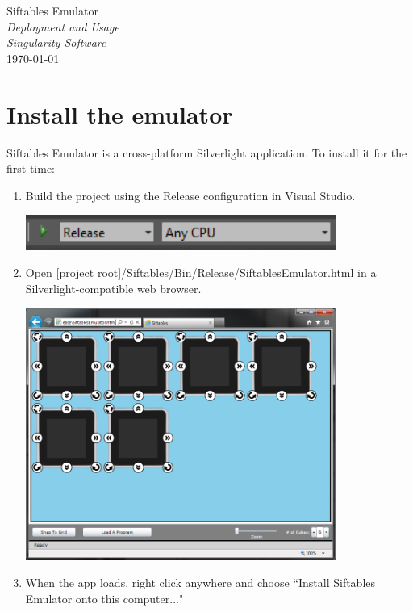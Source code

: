 \documentclass[12pt]{article}
\begin{document}
\begin{center}
	\LARGE{Siftables Emulator} \\
	\LARGE{\textit{Deployment and Usage}}\\
	\Large{\textit{Singularity Software}} \\
	\vspace{.05in}
	\normalsize{\today} \\
\end{center}

\section{Install the emulator}
Siftables Emulator is a cross-platform Silverlight application. To install it for the first time:
\begin{enumerate}
\item Build the project using the Release configuration in Visual Studio.
\begin{center}\includegraphics[width=4in]{0-1ReleaseBuild}\end{center}
\item Open [project root]/Siftables/Bin/Release/SiftablesEmulator.html in a Silverlight-compatible web browser.
\begin{center}\includegraphics[width=4in]{0-2WebBrowser}\end{center}
\item When the app loads, right click anywhere and choose ``Install Siftables Emulator onto this computer..."

\end{enumerate}
\end{document}
